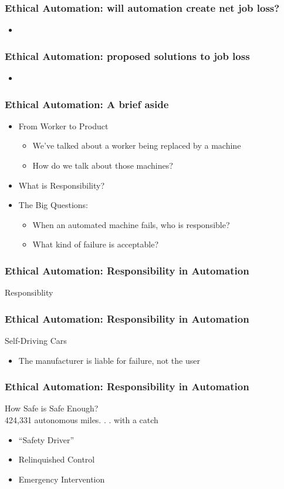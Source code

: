 \begin{frame}
	\frametitle{ Ethical Automation: will automation create net job loss?}
	\begin{itemize} 
		\item
	\end{itemize}
\end{frame}


\begin{frame}
	\frametitle{ Ethical Automation: proposed solutions to job loss}
	\begin{itemize}
		\item
	\end{itemize}
\end{frame}

\begin{frame}
	\frametitle{ Ethical Automation: A brief aside}
	\begin{itemize}
		\item From Worker to Product
		\begin{itemize}
			\item We've talked about a worker being replaced by a machine
			\item How do we talk about those machines?
		\end{itemize}
		\item What is Responsibility?
		\item The Big Questions:
		\begin{itemize}
			\item When an automated machine fails, who is responsible?
			\item What kind of failure is acceptable?
		\end{itemize}
	\end{itemize}
\end{frame}


\begin{frame}
	\frametitle{ Ethical Automation: Responsibility in Automation}
	\Large{Responsiblity}
\end{frame}


\begin{frame}
	\frametitle{ Ethical Automation: Responsibility in Automation}
	{\Large Self-Driving Cars}
	\begin{itemize}
		\item The manufacturer is liable for failure, not the user
	\end{itemize}
\end{frame}


\begin{frame}
	\frametitle{ Ethical Automation: Responsibility in Automation}
	{\Large How Safe is Safe Enough?}\\
	424,331 autonomous miles. . . with a catch
	\begin{itemize}
		\item ``Safety Driver''
		\item Relinquished Control
		\item Emergency Intervention
	\end{itemize}
\end{frame}


